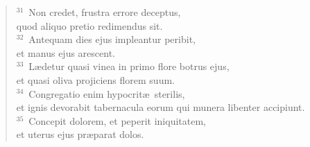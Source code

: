 \begin{flushleft}
\begin{verse}
${}^{31}$~Non credet, frustra errore deceptus,\\ quod aliquo pretio redimendus sit.\\
${}^{32}$~Antequam dies ejus impleantur peribit,\\ et manus ejus arescent.\\
${}^{33}$~L\ae detur quasi vinea in primo flore botrus ejus,\\ et quasi oliva projiciens florem suum.\\
${}^{34}$~Congregatio enim hypocrit\ae\ sterilis,\\ et ignis devorabit tabernacula eorum qui munera libenter accipiunt.\\
${}^{35}$~Concepit dolorem, et peperit iniquitatem,\\ et uterus ejus pr\ae parat dolos.\end{verse}\end{flushleft}



